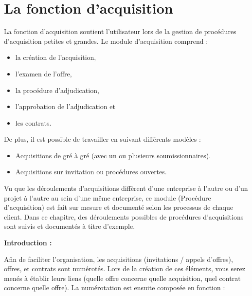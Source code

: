 
\clearpage
\section{La fonction d'acquisition}

La fonction d'acquisition soutient l'utilisateur lors de la gestion de procédures d'acquisition petites et grandes. Le module d'acquisition comprend :

\begin{itemize}
\item la création de l'acquisition,
\item l'examen de l'offre,
\item la procédure d'adjudication,
\item l'approbation de l'adjudication et
\item les contrats.
\end{itemize}

\vspace{\baselineskip}

De plus, il est possible de travailler en suivant différents modèles :

\begin{itemize}
\item Acquisitions de gré à gré (avec un ou plusieurs soumissionnaires).
\item Acquisitions sur invitation ou procédures ouvertes.
\end{itemize}

\vspace{\baselineskip}

Vu que les déroulements d'acquisitions diffèrent d'une entreprise à l'autre ou d'un projet à l'autre au sein d'une même entreprise, ce module (Procédure d'acquisition) est fait sur mesure et documenté selon les processus de chaque client. Dans ce chapitre, des déroulements possibles de procédures d'acquisitions sont suivis et documentés à titre d'exemple.

\vspace{\baselineskip}

\textbf{Introduction :}

Afin de faciliter l'organisation, les acquisitions (invitations / appels d'offres), offres, et contrats sont numérotés. Lors de la création de ces éléments, vous serez menés à établir leurs liens (quelle offre concerne quelle acquisition, quel contrat concerne quelle offre). La numérotation est ensuite composée en fonction :

\vspace{\baselineskip}


